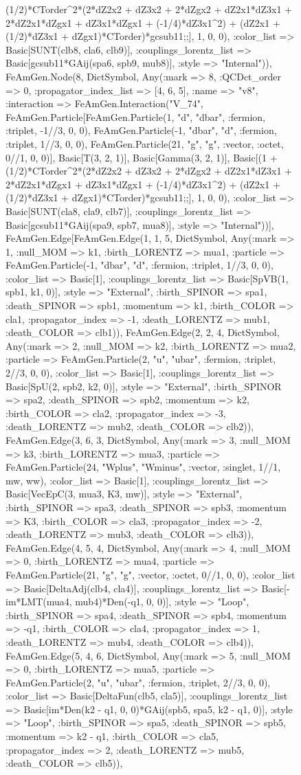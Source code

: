\documentclass{revtex4}
\begin{document}
\begin{figure}[!htb]
\begin{center}
{(1/2)*CTorder^2*(2*dZ2x2 + dZ3x2 + 2*dZgx2 + dZ2x1*dZ3x1 + 2*dZ2x1*dZgx1 + dZ3x1*dZgx1 + (-1/4)*dZ3x1^2) + (dZ2x1 + (1/2)*dZ3x1 + dZgx1)*CTorder)*gcsub11;;], 1, 0, 0), :color_list => Basic[SUNT(clb8, cla6, clb9)], :couplings_lorentz_list => Basic[gcsub11*GAij(spa6, spb9, mub8)], :style => "Internal")), FeAmGen.Node(8, Dict{Symbol, Any}(:mark => 8, :QCDct_order => 0, :propagator_index_list => [4, 6, 5], :name => "v8", :interaction => FeAmGen.Interaction("V_74", FeAmGen.Particle[FeAmGen.Particle(1, "d", "dbar", :fermion, :triplet, -1//3, 0, 0), FeAmGen.Particle(-1, "dbar", "d", :fermion, :triplet, 1//3, 0, 0), FeAmGen.Particle(21, "g", "g", :vector, :octet, 0//1, 0, 0)], Basic[T(3, 2, 1)], Basic[Gamma(3, 2, 1)], Basic[(1 + (1/2)*CTorder^2*(2*dZ2x2 + dZ3x2 + 2*dZgx2 + dZ2x1*dZ3x1 + 2*dZ2x1*dZgx1 + dZ3x1*dZgx1 + (-1/4)*dZ3x1^2) + (dZ2x1 + (1/2)*dZ3x1 + dZgx1)*CTorder)*gcsub11;;], 1, 0, 0), :color_list => Basic[SUNT(cla8, cla9, clb7)], :couplings_lorentz_list => Basic[gcsub11*GAij(spa9, spb7, mua8)], :style => "Internal"))], FeAmGen.Edge[FeAmGen.Edge(1, 1, 5, Dict{Symbol, Any}(:mark => 1, :null_MOM => k1, :birth_LORENTZ => mua1, :particle => FeAmGen.Particle(-1, "dbar", "d", :fermion, :triplet, 1//3, 0, 0), :color_list => Basic[1], :couplings_lorentz_list => Basic[SpVB(1, spb1, k1, 0)], :style => "External", :birth_SPINOR => spa1, :death_SPINOR => spb1, :momentum => k1, :birth_COLOR => cla1, :propagator_index => -1, :death_LORENTZ => mub1, :death_COLOR => clb1)), FeAmGen.Edge(2, 2, 4, Dict{Symbol, Any}(:mark => 2, :null_MOM => k2, :birth_LORENTZ => mua2, :particle => FeAmGen.Particle(2, "u", "ubar", :fermion, :triplet, 2//3, 0, 0), :color_list => Basic[1], :couplings_lorentz_list => Basic[SpU(2, spb2, k2, 0)], :style => "External", :birth_SPINOR => spa2, :death_SPINOR => spb2, :momentum => k2, :birth_COLOR => cla2, :propagator_index => -3, :death_LORENTZ => mub2, :death_COLOR => clb2)), FeAmGen.Edge(3, 6, 3, Dict{Symbol, Any}(:mark => 3, :null_MOM => k3, :birth_LORENTZ => mua3, :particle => FeAmGen.Particle(24, "Wplus", "Wminus", :vector, :singlet, 1//1, mw, ww), :color_list => Basic[1], :couplings_lorentz_list => Basic[VecEpC(3, mua3, K3, mw)], :style => "External", :birth_SPINOR => spa3, :death_SPINOR => spb3, :momentum => K3, :birth_COLOR => cla3, :propagator_index => -2, :death_LORENTZ => mub3, :death_COLOR => clb3)), FeAmGen.Edge(4, 5, 4, Dict{Symbol, Any}(:mark => 4, :null_MOM => 0, :birth_LORENTZ => mua4, :particle => FeAmGen.Particle(21, "g", "g", :vector, :octet, 0//1, 0, 0), :color_list => Basic[DeltaAdj(clb4, cla4)], :couplings_lorentz_list => Basic[-im*LMT(mua4, mub4)*Den(-q1, 0, 0)], :style => "Loop", :birth_SPINOR => spa4, :death_SPINOR => spb4, :momentum => -q1, :birth_COLOR => cla4, :propagator_index => 1, :death_LORENTZ => mub4, :death_COLOR => clb4)), FeAmGen.Edge(5, 4, 6, Dict{Symbol, Any}(:mark => 5, :null_MOM => 0, :birth_LORENTZ => mua5, :particle => FeAmGen.Particle(2, "u", "ubar", :fermion, :triplet, 2//3, 0, 0), :color_list => Basic[DeltaFun(clb5, cla5)], :couplings_lorentz_list => Basic[im*Den(k2 - q1, 0, 0)*GAij(spb5, spa5, k2 - q1, 0)], :style => "Loop", :birth_SPINOR => spa5, :death_SPINOR => spb5, :momentum => k2 - q1, :birth_COLOR => cla5, :propagator_index => 2, :death_LORENTZ => mub5, :death_COLOR => clb5)), }
\end{center}
\end{figure}
\end{document}
